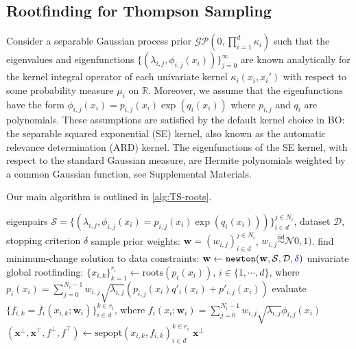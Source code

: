 \documentclass{article}
\newcommand{\edit}[1]{\textcolor{blue!80!black}{#1}} %
\begin{document}
\subsection{Rootfinding for Thompson Sampling}

Consider a separable Gaussian process prior
$\mathcal{GP}(0, \prod_{i=1}^d \kappa_i)$ such that the eigenvalues
and eigenfunctions $\{(\lambda_{i,j}, \phi_{i,j}(x_i))\}_{j=0}^\infty$
are known analytically for the kernel integral operator of each
univariate kernel $\kappa_i(x_i, x_i')$ with respect to some
probability measure $\mu_i$ on $\mathbb{R}$. Moreover, we assume
that the eigenfunctions have the form
$\phi_{i,j}(x_i) = p_{i,j}(x_i) \exp(q_i(x_i))$ where $p_{i,j}$ and
$q_i$ are polynomials. These assumptions are satisfied by the default
kernel choice in BO: the separable squared exponential (SE) kernel, also
known as the automatic relevance determination (ARD) kernel. The
eigenfunctions of the SE kernel, with respect to the standard Gaussian
measure, are Hermite polynomials weighted by a common Gaussian function,
see Supplemental Materials.

Our main algorithm is outlined in \cref{alg:TS-roots}.

\begin{algorithm}[h]
  \caption{\texttt{TS-roots}: Global optimization of a separable %
    Thompson sample via rootfinding.}
  \label{alg:TS-roots}
  \begin{algorithmic}[1] %
    \Input eigenpairs
    $\mathcal{S} = \{(\lambda_{i,j}, \phi_{i,j}(x_i) = p_{i,j}(x_i) \exp(q_i(x_i)))\}_{i \in d}^{j \in N_i}$,
    dataset $\mathcal{D}$,
    \edit{stopping criterion $\delta$}
    \State sample prior weights: $\mathbf{w} = (w_{i,j})_{i \in d}^{j \in N_i}$,
    $w_{i,j} \overset{\text{iid}}{\sim} \mathcal{N}0, 1)$.
    \State find minimum-change solution to data constraints:
    $\mathbf{w} \gets \texttt{newton}(\mathbf{w}, \mathcal{S}, \mathcal{D}, \edit{\delta})$
    \State univariate global rootfinding: $\{x_{i,k}\}_{k=1}^{r_i} \gets \mathrm{roots}(p_i(x_i))$,
    $i \in \{1, \cdots, d\}$, where \newline
    $p_i(x_i) = \sum_{j=0}^{N_i - 1} w_{i,j} \sqrt{\lambda_{i,j}} (p_{i,j}(x_i) q'_i(x_i) + p'_{i,j}(x_i))$
    \State evaluate $\{f_{i,k} = f_i(x_{i,k}; \mathbf{w}_i)\}_{i \in d}^{k \in r_i}$, where
    $f_i(x_i; \mathbf{w}_i) = \sum_{j=0}^{N_i - 1} w_{i,j} \sqrt{\lambda_{i,j}} \phi_{i,j}(x_i)$
    \State $(\mathbf{x}^\bot, \mathbf{x}^\top, f^\bot, f^\top) \gets
    \mathrm{sepopt}(x_{i,k}, f_{i,k})_{i \in d}^{k \in r_i}$
    \Output $\mathbf{x}^\bot$
  \end{algorithmic}
\end{algorithm}
\end{document}
